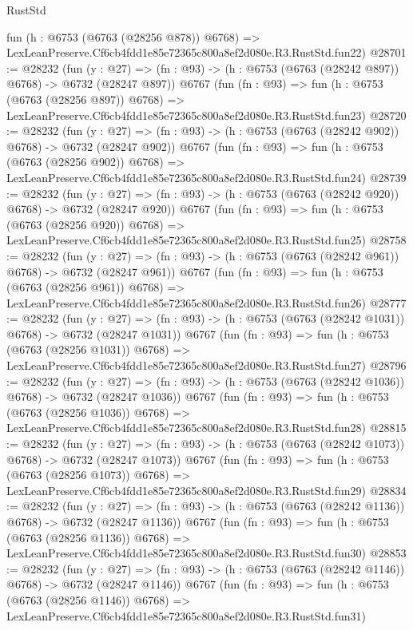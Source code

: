 \begin{lexlean}{RustStd}
\begin{coremodule}
    fun (h : @6753 (@6763 (@28256 @878)) @6768) =>
    LexLeanPreserve.Cf6cb4fdd1e85e72365c800a8ef2d080e.R3.RustStd.fun22)
@28701 := @28232
    (fun (y : @27) => (fn : @93) -> (h : @6753 (@6763 (@28242 @897)) @6768) -> @6732 (@28247 @897))
    @6767
    (fun (fn : @93) =>
    fun (h : @6753 (@6763 (@28256 @897)) @6768) =>
    LexLeanPreserve.Cf6cb4fdd1e85e72365c800a8ef2d080e.R3.RustStd.fun23)
@28720 := @28232
    (fun (y : @27) => (fn : @93) -> (h : @6753 (@6763 (@28242 @902)) @6768) -> @6732 (@28247 @902))
    @6767
    (fun (fn : @93) =>
    fun (h : @6753 (@6763 (@28256 @902)) @6768) =>
    LexLeanPreserve.Cf6cb4fdd1e85e72365c800a8ef2d080e.R3.RustStd.fun24)
@28739 := @28232
    (fun (y : @27) => (fn : @93) -> (h : @6753 (@6763 (@28242 @920)) @6768) -> @6732 (@28247 @920))
    @6767
    (fun (fn : @93) =>
    fun (h : @6753 (@6763 (@28256 @920)) @6768) =>
    LexLeanPreserve.Cf6cb4fdd1e85e72365c800a8ef2d080e.R3.RustStd.fun25)
@28758 := @28232
    (fun (y : @27) => (fn : @93) -> (h : @6753 (@6763 (@28242 @961)) @6768) -> @6732 (@28247 @961))
    @6767
    (fun (fn : @93) =>
    fun (h : @6753 (@6763 (@28256 @961)) @6768) =>
    LexLeanPreserve.Cf6cb4fdd1e85e72365c800a8ef2d080e.R3.RustStd.fun26)
@28777 := @28232
    (fun (y : @27) =>
    (fn : @93) -> (h : @6753 (@6763 (@28242 @1031)) @6768) -> @6732 (@28247 @1031))
    @6767
    (fun (fn : @93) =>
    fun (h : @6753 (@6763 (@28256 @1031)) @6768) =>
    LexLeanPreserve.Cf6cb4fdd1e85e72365c800a8ef2d080e.R3.RustStd.fun27)
@28796 := @28232
    (fun (y : @27) =>
    (fn : @93) -> (h : @6753 (@6763 (@28242 @1036)) @6768) -> @6732 (@28247 @1036))
    @6767
    (fun (fn : @93) =>
    fun (h : @6753 (@6763 (@28256 @1036)) @6768) =>
    LexLeanPreserve.Cf6cb4fdd1e85e72365c800a8ef2d080e.R3.RustStd.fun28)
@28815 := @28232
    (fun (y : @27) =>
    (fn : @93) -> (h : @6753 (@6763 (@28242 @1073)) @6768) -> @6732 (@28247 @1073))
    @6767
    (fun (fn : @93) =>
    fun (h : @6753 (@6763 (@28256 @1073)) @6768) =>
    LexLeanPreserve.Cf6cb4fdd1e85e72365c800a8ef2d080e.R3.RustStd.fun29)
@28834 := @28232
    (fun (y : @27) =>
    (fn : @93) -> (h : @6753 (@6763 (@28242 @1136)) @6768) -> @6732 (@28247 @1136))
    @6767
    (fun (fn : @93) =>
    fun (h : @6753 (@6763 (@28256 @1136)) @6768) =>
    LexLeanPreserve.Cf6cb4fdd1e85e72365c800a8ef2d080e.R3.RustStd.fun30)
@28853 := @28232
    (fun (y : @27) =>
    (fn : @93) -> (h : @6753 (@6763 (@28242 @1146)) @6768) -> @6732 (@28247 @1146))
    @6767
    (fun (fn : @93) =>
    fun (h : @6753 (@6763 (@28256 @1146)) @6768) =>
    LexLeanPreserve.Cf6cb4fdd1e85e72365c800a8ef2d080e.R3.RustStd.fun31)

\end{coremodule}
\end{lexlean}
